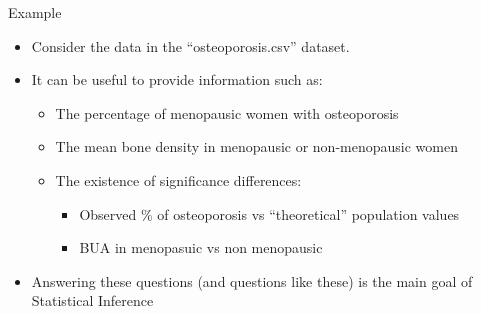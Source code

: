 \documentclass[
  ignorenonframetext,
]{beamer}
\providecommand{\tightlist}{%
  \setlength{\itemsep}{0pt}\setlength{\parskip}{0pt}}
\begin{document}
\begin{frame}{Example}
\protect\hypertarget{example}{}
\begin{itemize}
\tightlist
\item
  Consider the data in the ``osteoporosis.csv'' dataset.
\item
  It can be useful to provide information such as:

  \begin{itemize}
  \tightlist
  \item
    The percentage of menopausic women with osteoporosis
  \item
    The mean bone density in menopausic or non-menopausic women
  \item
    The existence of significance differences:

    \begin{itemize}
    \tightlist
    \item
      Observed \% of osteoporosis vs ``theoretical'' population values
    \item
      BUA in menopasuic vs non menopausic
    \end{itemize}
  \end{itemize}
\item
  Answering these questions (and questions like these) is the main goal
  of Statistical Inference
\end{itemize}
\end{frame}
\end{document}
